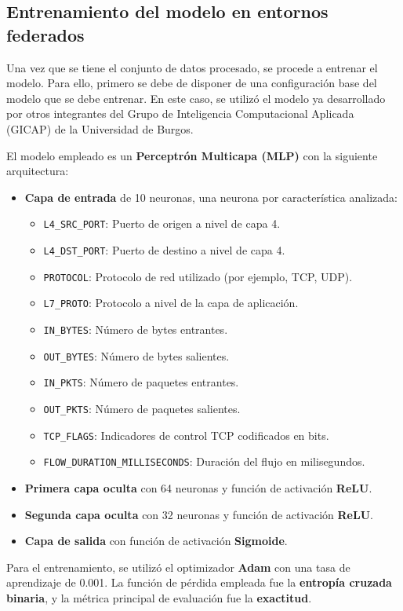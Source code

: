 \subsection{Entrenamiento del modelo en entornos federados}
\label{subsec:EntrenamientoModelo}
Una vez que se tiene el conjunto de datos procesado, se procede a entrenar el modelo. Para ello, primero se debe de disponer de una configuración base del modelo que se debe entrenar. En este caso, se utilizó el modelo ya desarrollado por otros integrantes del Grupo de Inteligencia Computacional Aplicada (GICAP) de la Universidad de Burgos.

El modelo empleado es un \textbf{Perceptrón Multicapa (MLP)} con la siguiente arquitectura:
\begin{itemize}
    \item \textbf{Capa de entrada} de 10 neuronas, una neurona por característica analizada:
    \begin{itemize}
        \item \texttt{L4\_SRC\_PORT}: Puerto de origen a nivel de capa 4.
        \item \texttt{L4\_DST\_PORT}: Puerto de destino a nivel de capa 4.
        \item \texttt{PROTOCOL}: Protocolo de red utilizado (por ejemplo, TCP, UDP).
        \item \texttt{L7\_PROTO}: Protocolo a nivel de la capa de aplicación.
        \item \texttt{IN\_BYTES}: Número de bytes entrantes.
        \item \texttt{OUT\_BYTES}: Número de bytes salientes.
        \item \texttt{IN\_PKTS}: Número de paquetes entrantes.
        \item \texttt{OUT\_PKTS}: Número de paquetes salientes.
        \item \texttt{TCP\_FLAGS}: Indicadores de control TCP codificados en bits.
        \item \texttt{FLOW\_DURATION\_MILLISECONDS}: Duración del flujo en milisegundos.
    \end{itemize}
    \item \textbf{Primera capa oculta} con 64 neuronas y función de activación \textbf{ReLU}.
    \item \textbf{Segunda capa oculta} con 32 neuronas y función de activación \textbf{ReLU}.
    \item \textbf{Capa de salida} con función de activación \textbf{Sigmoide}.
\end{itemize}
Para el entrenamiento, se utilizó el optimizador \textbf{Adam} con una tasa de aprendizaje de 0.001. La función de pérdida empleada fue la \textbf{entropía cruzada binaria}, y la métrica principal de evaluación fue la \textbf{exactitud}.


